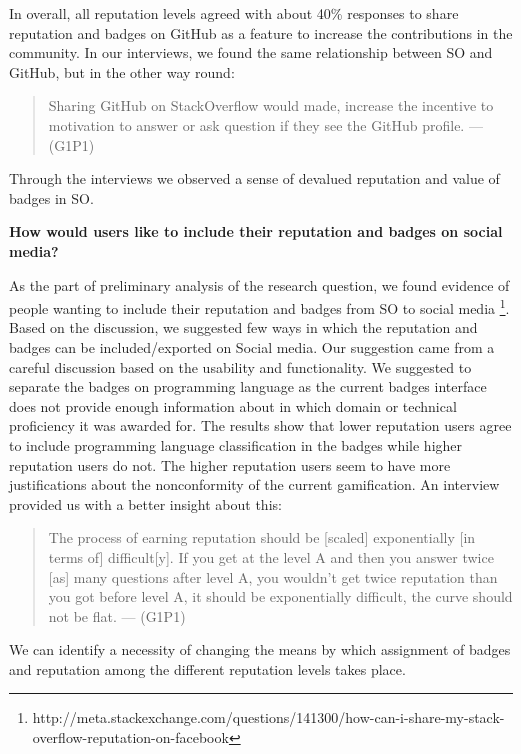 \documentclass{sigchi}
\begin{document}
In overall, all reputation levels agreed with about 40\% responses to share reputation and badges on GitHub as a feature to increase the contributions in the community. In our interviews, we found the same relationship between SO and GitHub, but in the other way round:

\begin{quote}
Sharing GitHub on StackOverflow would made, increase the incentive to motivation to answer or ask question if they see the GitHub profile. --- (G1P1)
\end{quote}

Through the interviews we observed a sense of devalued reputation and value of badges in SO.

\textbf{How would users like to include their reputation and badges on social media?}

As the part of preliminary analysis of the research question, we found evidence of people wanting to include their reputation and badges from SO to social media \footnote{http://meta.stackexchange.com/questions/141300/how-can-i-share-my-stack-overflow-reputation-on-facebook}. Based on the discussion, we suggested few ways in which the reputation and badges can be included/exported on Social media. Our suggestion came from a careful discussion based on the usability and functionality. We suggested to separate the badges on programming language as the current badges interface does not provide enough information about in which domain or technical proficiency it was awarded for. The results show that lower reputation users agree to include programming language classification in the badges while higher reputation users do not. The higher reputation users seem to have more justifications about the nonconformity of the current gamification. An interview provided us with  a better insight about this:

\begin{quote}
The process of earning reputation should be [scaled] exponentially [in terms of] difficult[y]. If you get at the level A and then you answer twice [as] many questions after level A, you wouldn’t get twice reputation than you got before level A, it should be exponentially difficult, the curve should not be flat. --- (G1P1)
\end{quote}

We can identify a necessity of changing the means by which assignment of  badges and reputation among the different reputation levels takes place.
\end{document}
